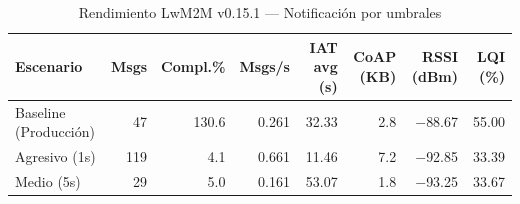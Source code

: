
\begin{table}[htbp]
\centering
\caption{Rendimiento LwM2M v0.15.1 — Notificación por umbrales}
\label{tab:lwm2m-benchmark-v0151}
\begin{tabular}{lrrrrrrr}
\toprule
\textbf{Escenario} & \textbf{Msgs} & \textbf{Compl.\%} & \textbf{Msgs/s} & \textbf{IAT avg (s)} & \textbf{CoAP (KB)} & \textbf{RSSI (dBm)} & \textbf{LQI (\%)} \\
\midrule
Baseline (Producción) & 47 & 130.6 & 0.261 & 32.33 & 2.8 & $-$88.67 & 55.00 \\
Agresivo (1s) & 119 & 4.1 & 0.661 & 11.46 & 7.2 & $-$92.85 & 33.39 \\
Medio (5s) & 29 & 5.0 & 0.161 & 53.07 & 1.8 & $-$93.25 & 33.67 \\
\bottomrule
\end{tabular}
\end{table}
